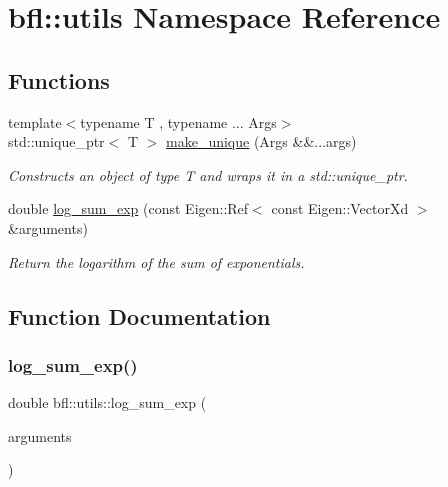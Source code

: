 \hypertarget{namespacebfl_1_1utils}{}\section{bfl\+:\+:utils Namespace Reference}
\label{namespacebfl_1_1utils}
\subsection*{Functions}
\begin{DoxyCompactItemize}
\item 
{\footnotesize template$<$typename T , typename ... Args$>$ }\\std\+::unique\+\_\+ptr$<$ T $>$ \mbox{\hyperlink{namespacebfl_1_1utils_ad9e9288a23debabef8314ac0d1006e66}{make\+\_\+unique}} (Args \&\&...args)
\begin{DoxyCompactList}\small\item\em Constructs an object of type T and wraps it in a std\+::unique\+\_\+ptr. \end{DoxyCompactList}\item 
double \mbox{\hyperlink{namespacebfl_1_1utils_a137b996032449ce79a5638cbcbb73966}{log\+\_\+sum\+\_\+exp}} (const Eigen\+::\+Ref$<$ const Eigen\+::\+Vector\+Xd $>$ \&arguments)
\begin{DoxyCompactList}\small\item\em Return the logarithm of the sum of exponentials. \end{DoxyCompactList}\end{DoxyCompactItemize}


\subsection{Function Documentation}
\mbox{\label{namespacebfl_1_1utils_a137b996032449ce79a5638cbcbb73966}} 
\subsubsection{\texorpdfstring{log\+\_\+sum\+\_\+exp()}{log\_sum\_exp()}}
{\footnotesize\ttfamily double bfl\+::utils\+::log\+\_\+sum\+\_\+exp (\begin{DoxyParamCaption}\item[{const Eigen\+::\+Ref$<$ const Eigen\+::\+Vector\+Xd $>$ \&}]{arguments }\end{DoxyParamCaption})}



